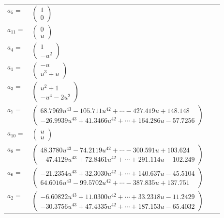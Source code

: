 \documentclass[1p]{elsarticle_modified}
\theoremstyle{definition}
\begin{document}
\begin{tabular}{m{7pt} m{180pt} m{7pt} m{180pt} }
\flushright $a_{5}=$&$\begin{pmatrix}1\\0\end{pmatrix}$ \\
\flushright $a_{11}=$&$\begin{pmatrix}0\\u\end{pmatrix}$ \\
\flushright $a_{4}=$&$\begin{pmatrix}1\\- u^2\end{pmatrix}$ \\
\flushright $a_{1}=$&$\begin{pmatrix}- u\\u^3+u\end{pmatrix}$ \\
\flushright $a_{3}=$&$\begin{pmatrix}u^2+1\\- u^4-2 u^2\end{pmatrix}$ \\
\flushright $a_{7}=$&$\begin{pmatrix}68.7969 u^{43}-105.711 u^{42}+\cdots-427.419 u+148.148\\-26.9939 u^{43}+41.3466 u^{42}+\cdots+164.286 u-57.7256\end{pmatrix}$ \\
\flushright $a_{10}=$&$\begin{pmatrix}u\\u\end{pmatrix}$ \\
\flushright $a_{8}=$&$\begin{pmatrix}48.3780 u^{43}-74.2119 u^{42}+\cdots-300.591 u+103.624\\-47.4129 u^{43}+72.8461 u^{42}+\cdots+291.114 u-102.249\end{pmatrix}$ \\
\flushright $a_{6}=$&$\begin{pmatrix}-21.2354 u^{43}+32.3030 u^{42}+\cdots+140.637 u-45.5104\\64.6016 u^{43}-99.5702 u^{42}+\cdots-387.835 u+137.751\end{pmatrix}$ \\
\flushright $a_{2}=$&$\begin{pmatrix}-6.60822 u^{43}+11.0300 u^{42}+\cdots+33.2318 u-11.2429\\-30.3756 u^{43}+47.4335 u^{42}+\cdots+187.153 u-65.4032\end{pmatrix}$ \\

\end{tabular}
\end{document}
